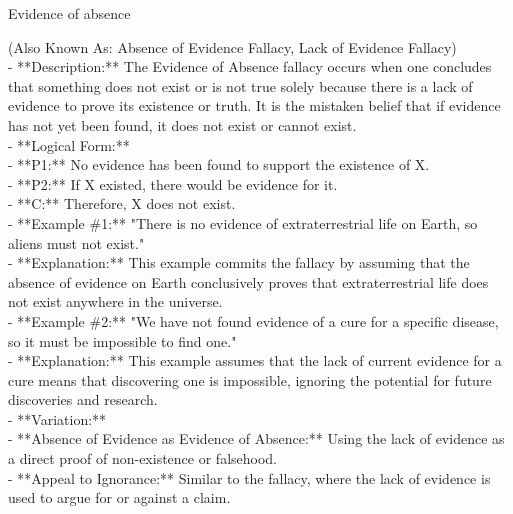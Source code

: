 \documentclass[a4paper,12pt,single,pdftex]{scrartcl}
\begin{document}
Evidence of absence
    
      (Also Known As: Absence of Evidence Fallacy, Lack of Evidence Fallacy)
    \\

  
    
      - **Description:** The Evidence of Absence fallacy occurs when one concludes that something does not exist or is not true solely because there is a lack of evidence to prove its existence or truth. It is the mistaken belief that if evidence has not yet been found, it does not exist or cannot exist.
    \\

    
      - **Logical Form:**
    \\

    
        - **P1:** No evidence has been found to support the existence of X.
    \\

    
        - **P2:** If X existed, there would be evidence for it.
    \\

    
        - **C:** Therefore, X does not exist.
    \\

    
      - **Example \#1:** "There is no evidence of extraterrestrial life on Earth, so aliens must not exist."
    \\

    
      - **Explanation:** This example commits the fallacy by assuming that the absence of evidence on Earth conclusively proves that extraterrestrial life does not exist anywhere in the universe.
    \\

    
      - **Example \#2:** "We have not found evidence of a cure for a specific disease, so it must be impossible to find one."
    \\

    
      - **Explanation:** This example assumes that the lack of current evidence for a cure means that discovering one is impossible, ignoring the potential for future discoveries and research.
    \\

    
      - **Variation:**
    \\

    
        - **Absence of Evidence as Evidence of Absence:** Using the lack of evidence as a direct proof of non-existence or falsehood.
    \\

    
        - **Appeal to Ignorance:** Similar to the fallacy, where the lack of evidence is used to argue for or against a claim.
    \\
\end{document}
